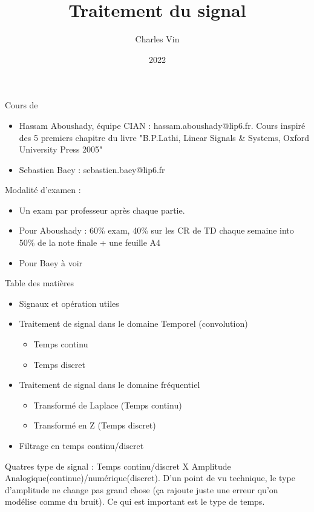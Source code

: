 \documentclass{article}
\title{Traitement du signal}
\author{Charles Vin}
\date{2022}
\theoremstyle{plain}%
\theoremstyle{definition}
\theoremstyle{remark}
\begin{document}
\maketitle

Cours de \begin{itemize}
    \item Hassam Aboushady, équipe CIAN : hassam.aboushady@lip6.fr. Cours inspiré des 5 premiers chapitre du livre "B.P.Lathi, Linear Signals \& Systems, Oxford University Press 2005" 
    \item Sebastien Baey : sebastien.baey@lip6.fr
\end{itemize}

Modalité d'examen : 
\begin{itemize}
    \item Un exam par professeur après chaque partie. 
    \item Pour Aboushady : 60\% exam, 40\% sur les CR de TD chaque semaine into 50\% de la note finale + une feuille A4
    \item Pour Baey à voir
\end{itemize}

Table des matières 
\begin{itemize}
    \item Signaux et opération utiles
    \item Traitement de signal dans le domaine Temporel (convolution) \begin{itemize}
        \item Temps continu
        \item Temps discret
    \end{itemize}
    \item Traitement de signal dans le domaine fréquentiel \begin{itemize}
        \item Transformé de Laplace (Temps continu)
        \item Transformé en Z (Temps discret)
    \end{itemize}
    \item Filtrage en temps continu/discret
\end{itemize}

Quatres type de signal : Temps continu/discret X Amplitude Analogique(continue)/numérique(discret). D'un point de vu technique, le type d'amplitude ne change pas grand chose (ça rajoute juste une erreur qu'on modélise comme du bruit). Ce qui est important est le type de temps.

\tableofcontents
\end{document}
